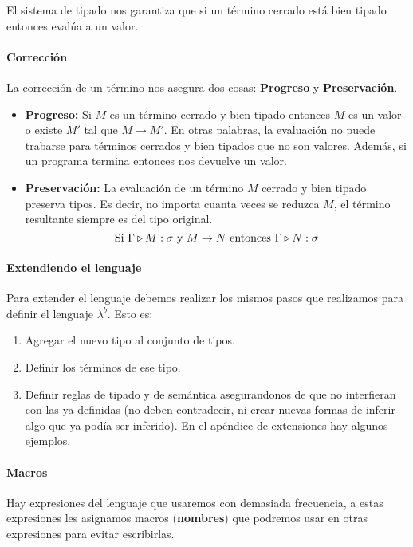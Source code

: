 El sistema de tipado nos garantiza que si un término cerrado está bien tipado entonces evalúa a un valor.


\paragraph{Corrección}
La corrección de un término nos asegura dos cosas:	\textbf{Progreso} y \textbf{Preservación}.

\begin{itemize}
	\item \textbf{Progreso:} Si $M$ es un término cerrado y bien tipado entonces $M$ es un valor o existe $M'$ tal que $M\to M'$. En otras palabras, la evaluación no puede trabarse para términos cerrados y bien tipados que no son valores. Además, si un programa termina entonces nos devuelve un valor.
	
	\item \textbf{Preservación:} La evaluación de un término $M$ cerrado y bien tipado preserva tipos. Es decir, no importa cuanta veces se reduzca $M$, el término resultante siempre es del tipo original.
	$$\text{Si } \Gamma\triangleright M : \sigma \text{ y } M\to N \text{ entonces } \Gamma\triangleright N : \sigma$$	
\end{itemize}



\paragraph{Extendiendo el lenguaje}
Para extender el lenguaje debemos realizar los mismos pasos que realizamos para definir el lenguaje $\lambda^b$. Esto es:
\begin{enumerate}
	\item Agregar el nuevo tipo al conjunto de tipos.
	\item Definir los términos de ese tipo.
	\item Definir reglas de tipado y de semántica asegurandonos de que no interfieran con las ya definidas (no deben contradecir, ni crear nuevas formas de inferir algo que ya podía ser inferido). En el apéndice de extensiones hay algunos ejemplos.
\end{enumerate}

\paragraph{Macros} Hay expresiones del lenguaje que usaremos con demasiada frecuencia, a estas expresiones les asignamos macros (\textbf{nombres}) que podremos usar en otras expresiones para evitar escribirlas.

